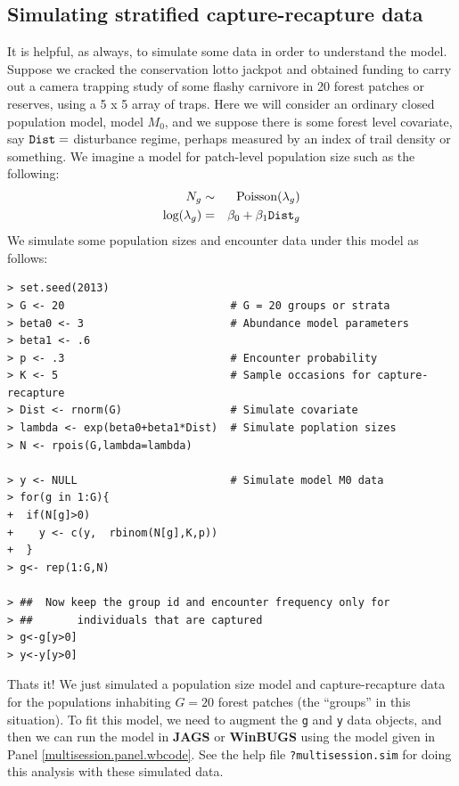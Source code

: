 \subsection{
Simulating stratified
capture-recapture data
}

It is helpful, as always, to simulate some data in order to understand
the model. Suppose we cracked the conservation lotto jackpot and
obtained funding to carry out a camera trapping study of some flashy
carnivore in 20 forest patches or reserves, using a 5 x 5 array of
traps. Here we will consider an ordinary closed population model,
model $M_0$, and we suppose there is some forest level covariate, say
$\mbox{\tt Dist} = $ disturbance regime, perhaps measured by an index of
trail density or something.  We imagine a model for patch-level
population size such as the following:
\begin{eqnarray*}
N_{g} &\sim& \mbox{Poisson}(\lambda_{g})  \\
\mbox{log}(\lambda_{g})& = &\beta_{0} + \beta_{1} \mbox{\tt Dist}_{g}
\end{eqnarray*}
We simulate some population sizes and encounter data under this model
as follows:
\begin{verbatim}
> set.seed(2013)
> G <- 20                          # G = 20 groups or strata
> beta0 <- 3                       # Abundance model parameters
> beta1 <- .6
> p <- .3                          # Encounter probability
> K <- 5                           # Sample occasions for capture-recapture
> Dist <- rnorm(G)                 # Simulate covariate
> lambda <- exp(beta0+beta1*Dist)  # Simulate poplation sizes
> N <- rpois(G,lambda=lambda)

> y <- NULL                        # Simulate model M0 data
> for(g in 1:G){
+  if(N[g]>0)
+    y <- c(y,  rbinom(N[g],K,p))
+  }
> g<- rep(1:G,N)

> ##  Now keep the group id and encounter frequency only for
> ##       individuals that are captured
> g<-g[y>0]
> y<-y[y>0]
\end{verbatim}
Thats it!
We just simulated a population size model and
capture-recapture data for the populations inhabiting
 $G=20$ forest patches (the ``groups'' in this situation). To fit
this model, we need to augment the \mbox{\tt g} and \mbox{\tt y} data
objects, and then we can run the model in {\bf JAGS} or {\bf WinBUGS}
using the model given in Panel \ref{multisession.panel.wbcode}.
See the help file \mbox{\tt ?multisession.sim}
for doing this analysis with these simulated data.



